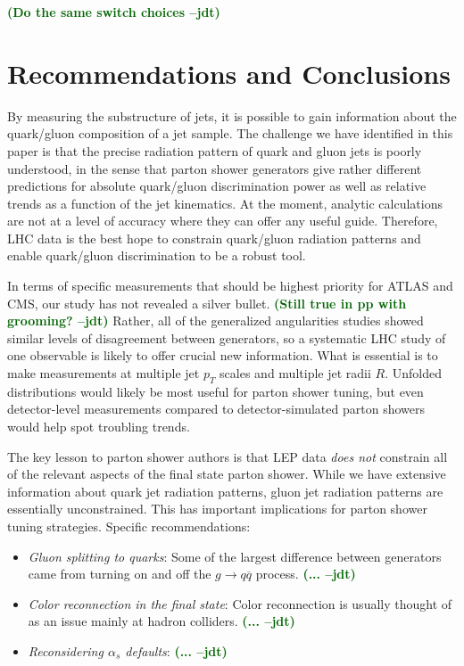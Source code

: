 \documentclass[11pt,letterpaper]{article}
\newcommand{\jdt}[1]{\textbf{\textcolor{darkgreen}{(#1 --jdt)}}}
\begin{document}
\jdt{Do the same switch choices}

\section{Recommendations and Conclusions}
\label{sec:conclude}

By measuring the substructure of jets, it is possible to gain information about the quark/gluon composition of a jet sample.  The challenge we have identified in this paper is that the precise radiation pattern of quark and gluon jets is poorly understood, in the sense that parton shower generators give rather different predictions for absolute quark/gluon discrimination power as well as relative trends as a function of the jet kinematics.  At the moment, analytic calculations are not at a level of accuracy where they can offer any useful guide.  Therefore, LHC data is the best hope to constrain quark/gluon radiation patterns and enable quark/gluon discrimination to be a robust tool.

In terms of specific measurements that should be highest priority for ATLAS and CMS, our study has not revealed a silver bullet.  \jdt{Still true in pp with grooming?}  Rather, all of the generalized angularities studies showed similar levels of disagreement between generators, so a systematic LHC study of one observable is likely to offer crucial new information.  What is essential is to make measurements at multiple jet $p_T$ scales and multiple jet radii $R$.  Unfolded distributions would likely be most useful for parton shower tuning, but even detector-level measurements compared to detector-simulated parton showers would help spot troubling trends.

The key lesson to parton shower authors is that LEP data \emph{does not} constrain all of the relevant aspects of the final state parton shower.  While we have extensive information about quark jet radiation patterns, gluon jet radiation patterns are essentially unconstrained.  This has important implications for parton shower tuning strategies.  Specific recommendations:
\begin{itemize}
\item \textit{Gluon splitting to quarks}:  Some of the largest difference between generators came from turning on and off the $g \to q \overline{q}$ process.  \jdt{...}
\item \textit{Color reconnection in the final state}:  Color reconnection is usually thought of as an issue mainly at hadron colliders.  \jdt{...}
\item \textit{Reconsidering $\alpha_s$ defaults}:  \jdt{...}
\end{itemize}
\end{document}
